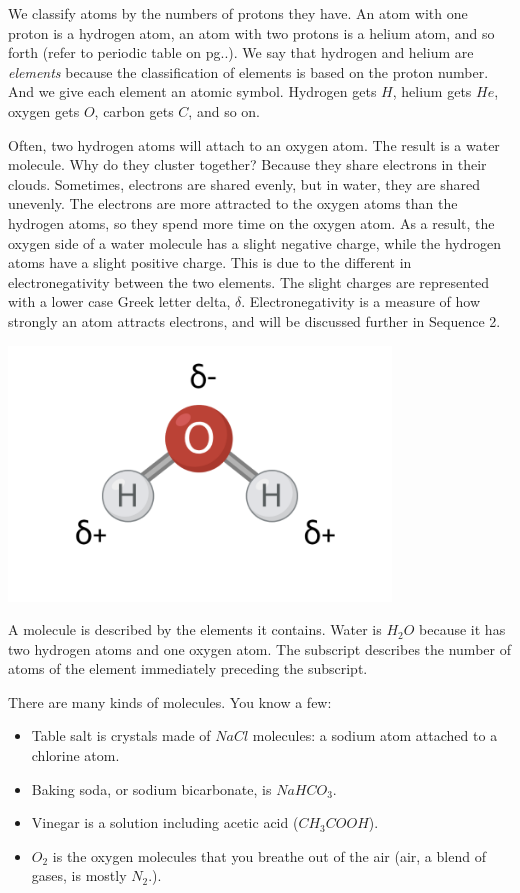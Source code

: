 We classify atoms by the numbers of protons they have. An atom with one proton
is a hydrogen atom, an atom with two protons is a helium atom, and so forth
(refer to periodic table on pg..). We say that hydrogen and helium are \textit{
elements} because the classification of elements is based on the proton number.
And we give each element an atomic symbol. Hydrogen gets $H$, helium gets $He$,
oxygen gets $O$, carbon gets $C$, and so on.

Often, two hydrogen atoms will attach to an oxygen atom. The result is
a water molecule. Why do they cluster together? Because they
share electrons in their clouds. Sometimes, electrons are shared evenly, but in
water, they are shared unevenly. The electrons are more attracted to the oxygen
atoms than the hydrogen atoms, so they spend more time on the oxygen atom. As a
result, the oxygen side of a water molecule has a slight negative charge, while
the hydrogen atoms have a slight positive charge. This is due to the different
in electronegativity between the two elements. The
slight charges are represented with a lower case Greek letter delta, $\delta$.
Electronegativity is a measure of how strongly an atom attracts electrons, and
will be discussed further in Sequence 2.

\begin{center}
\includegraphics[width=4in]{water_polar.png}
\end{center}

A molecule is described by the elements it contains. Water is $H_2O$
because it has two hydrogen atoms and one oxygen atom. The subscript describes
the number of atoms of the element immediately preceding the subscript.

There are many kinds of molecules. You know a few:
\begin{itemize}
\item Table salt is crystals made of $NaCl$ molecules: a sodium atom attached
to a chlorine atom.
\item Baking soda, or sodium bicarbonate, is $NaHCO_3$.
\item Vinegar is a solution including acetic acid ($CH_3COOH$).
\item $O_2$ is the oxygen molecules that you breathe out of the air (air, a
blend of gases, is mostly $N_2$.).
\end{itemize}

